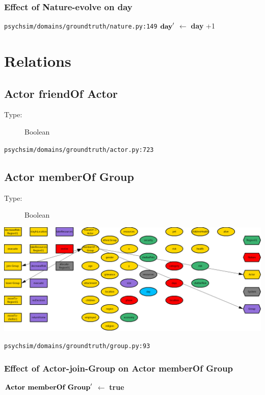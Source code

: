 \documentclass{article}%
\begin{document}
\subsubsection{Effect of Nature{-}evolve on day}%
\label{ssubsec:Effect of Nature{-}evolve on day}%
\begin{flushleft}%
\verb|psychsim/domains/groundtruth/nature.py:149|%
\linebreak%
$\mbox{\textbf{day}} '$%
$\leftarrow$%
\textbf{day}%
+1%
\end{flushleft}

%
\section{Relations}%
\label{sec:Relations}%
\subsection{Actor friendOf Actor}%
\label{subsec:Actor friendOf Actor}%
\begin{description}%
\item[Type:]%
Boolean%
\end{description}%
\begin{flushleft}%
\verb|psychsim/domains/groundtruth/actor.py:723|%
\end{flushleft}

%
\subsection{Actor memberOf Group}%
\label{subsec:Actor memberOf Group}%
\begin{description}%
\item[Type:]%
Boolean%
\end{description}%
\includegraphics[width=\textwidth]{images/ActormemberOf->Group.png}%
\begin{flushleft}%
\verb|psychsim/domains/groundtruth/group.py:93|%
\end{flushleft}%
\subsubsection{Effect of Actor{-}join{-}Group on Actor memberOf Group}%
\label{ssubsec:Effect of Actor{-}join{-}Group on Actor memberOf Group}%
\begin{flushleft}%
$\mbox{\textbf{Actor memberOf Group}} '$%
$\leftarrow$%
\textbf{true}%
\end{flushleft}
\end{document}
